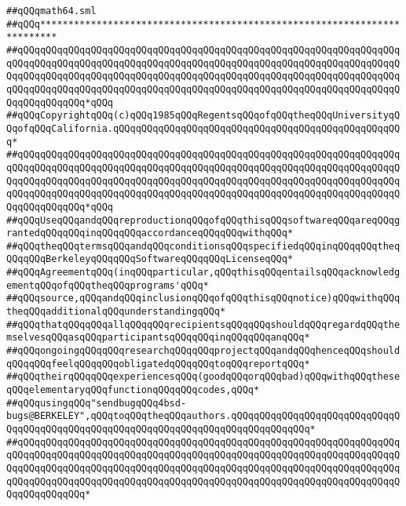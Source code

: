 \label{src/lib/std/src/math64-sqrt.pkg}
\verb|##qQQqmath64.sml|\newline
\verb|##qQQq*************************************************************************|\newline
\verb|##qQQqqQQqqQQqqQQqqQQqqQQqqQQqqQQqqQQqqQQqqQQqqQQqqQQqqQQqqQQqqQQqqQQqqQQqqQQqqQQqqQQqqQQqqQQqqQQqqQQqqQQqqQQqqQQqqQQqqQQqqQQqqQQqqQQqqQQqqQQqqQQqqQQqqQQqqQQqqQQqqQQqqQQqqQQqqQQqqQQqqQQqqQQqqQQqqQQqqQQqqQQqqQQqqQQqqQQqqQQqqQQqqQQqqQQqqQQqqQQqqQQqqQQqqQQqqQQqqQQqqQQqqQQqqQQqqQQqqQQqqQQqqQQqqQQq*qQQq|\newline
\verb|##qQQqCopyrightqQQq(c)qQQq1985qQQqRegentsqQQqofqQQqtheqQQqUniversityqQQqofqQQqCalifornia.qQQqqQQqqQQqqQQqqQQqqQQqqQQqqQQqqQQqqQQqqQQqqQQqqQQq*|\newline
\verb|##qQQqqQQqqQQqqQQqqQQqqQQqqQQqqQQqqQQqqQQqqQQqqQQqqQQqqQQqqQQqqQQqqQQqqQQqqQQqqQQqqQQqqQQqqQQqqQQqqQQqqQQqqQQqqQQqqQQqqQQqqQQqqQQqqQQqqQQqqQQqqQQqqQQqqQQqqQQqqQQqqQQqqQQqqQQqqQQqqQQqqQQqqQQqqQQqqQQqqQQqqQQqqQQqqQQqqQQqqQQqqQQqqQQqqQQqqQQqqQQqqQQqqQQqqQQqqQQqqQQqqQQqqQQqqQQqqQQqqQQqqQQqqQQqqQQq*qQQq|\newline
\verb|##qQQqUseqQQqandqQQqreproductionqQQqofqQQqthisqQQqsoftwareqQQqareqQQqgrantedqQQqqQQqinqQQqqQQqaccordanceqQQqqQQqwithqQQq*|\newline
\verb|##qQQqtheqQQqtermsqQQqandqQQqconditionsqQQqspecifiedqQQqinqQQqqQQqtheqQQqqQQqBerkeleyqQQqqQQqSoftwareqQQqqQQqLicenseqQQq*|\newline
\verb|##qQQqAgreementqQQq(inqQQqparticular,qQQqthisqQQqentailsqQQqacknowledgementqQQqofqQQqtheqQQqprograms'qQQq*|\newline
\verb|##qQQqsource,qQQqandqQQqinclusionqQQqofqQQqthisqQQqnotice)qQQqwithqQQqtheqQQqadditionalqQQqunderstandingqQQq*|\newline
\verb|##qQQqthatqQQqqQQqallqQQqqQQqrecipientsqQQqqQQqshouldqQQqregardqQQqthemselvesqQQqasqQQqparticipantsqQQqqQQqinqQQqqQQqanqQQq*|\newline
\verb|##qQQqongoingqQQqqQQqresearchqQQqqQQqprojectqQQqandqQQqhenceqQQqshouldqQQqqQQqfeelqQQqqQQqobligatedqQQqqQQqtoqQQqreportqQQq*|\newline
\verb|##qQQqtheirqQQqqQQqexperiencesqQQq(goodqQQqorqQQqbad)qQQqwithqQQqtheseqQQqelementaryqQQqfunctionqQQqqQQqcodes,qQQq*|\newline
\verb|##qQQqusingqQQq"sendbugqQQq4bsd-bugs@BERKELEY",qQQqtoqQQqtheqQQqauthors.qQQqqQQqqQQqqQQqqQQqqQQqqQQqqQQqqQQqqQQqqQQqqQQqqQQqqQQqqQQqqQQqqQQqqQQqqQQqqQQqqQQq*|\newline
\verb|##qQQqqQQqqQQqqQQqqQQqqQQqqQQqqQQqqQQqqQQqqQQqqQQqqQQqqQQqqQQqqQQqqQQqqQQqqQQqqQQqqQQqqQQqqQQqqQQqqQQqqQQqqQQqqQQqqQQqqQQqqQQqqQQqqQQqqQQqqQQqqQQqqQQqqQQqqQQqqQQqqQQqqQQqqQQqqQQqqQQqqQQqqQQqqQQqqQQqqQQqqQQqqQQqqQQqqQQqqQQqqQQqqQQqqQQqqQQqqQQqqQQqqQQqqQQqqQQqqQQqqQQqqQQqqQQqqQQqqQQqqQQqqQQqqQQq*|\newline
